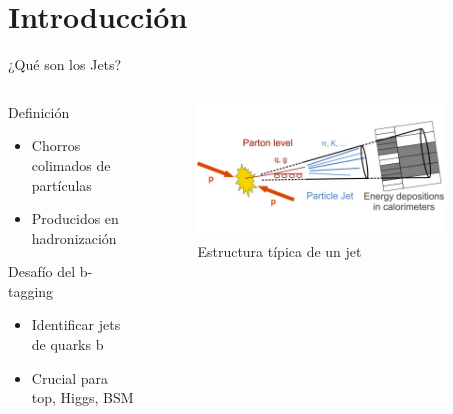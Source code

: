 \documentclass[aspectratio=169]{beamer}
\begin{document}
\section{Introducción}
\begin{frame}{¿Qué son los Jets?}
  \begin{columns}
    \begin{column}{0.45\textwidth}
      \begin{block}{Definición}
        \begin{itemize}
          \item Chorros colimados de partículas
          \item Producidos en hadronización
        \end{itemize}
      \end{block}
      \begin{alertblock}{Desafío del b-tagging}
        \begin{itemize}
          \item Identificar jets de quarks b
          \item Crucial para top, Higgs, BSM
        \end{itemize}
      \end{alertblock}
    \end{column}
    \begin{column}{0.55\textwidth}
      \begin{figure}
        \includegraphics[width=0.9\textwidth]{jet1.png}
        \caption{Estructura típica de un jet}
      \end{figure}
    \end{column}
  \end{columns}
\end{frame}
\end{document}
